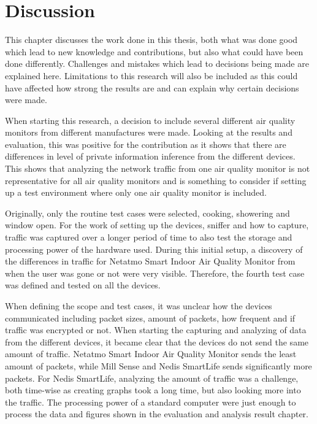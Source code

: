 \chapter{Discussion}
This chapter discusses the work done in this thesis, both what was done good which lead to new knowledge and contributions, but also what could have been done differently. Challenges and mistakes which lead to decisions being made are explained here. Limitations to this research will also be included as this could have affected how strong the results are and can explain why certain decisions were made. 

When starting this research, a decision to include several different air quality monitors from different manufactures were made. Looking at the results and evaluation, this was positive for the contribution as it shows that there are differences in level of private information inference from the different devices. This shows that analyzing the network traffic from one air quality monitor is not representative for all air quality monitors and is something to consider if setting up a test environment where only one air quality monitor is included.

Originally, only the routine test cases were selected, cooking, showering and window open. For the work of setting up the devices, sniffer and how to capture, traffic was captured over a longer period of time to also test the storage and processing power of the hardware used. During this initial setup, a discovery of the differences in traffic for Netatmo Smart Indoor Air Quality Monitor from when the user was gone or not were very visible. Therefore, the fourth test case was defined and tested on all the devices. 

When defining the scope and test cases, it was unclear how the devices communicated including packet sizes, amount of packets, how frequent and if traffic was encrypted or not. When starting the capturing and analyzing of data from the different devices, it became clear that the devices do not send the same amount of traffic. Netatmo Smart Indoor Air Quality Monitor sends the least amount of packets, while Mill Sense and Nedis SmartLife sends significantly more packets. For Nedis SmartLife, analyzing the amount of traffic was a challenge, both time-wise as creating graphs took a long time, but also looking more into the traffic. The processing power of a standard computer were just enough to process the data and figures shown in the evaluation and analysis result chapter. 

